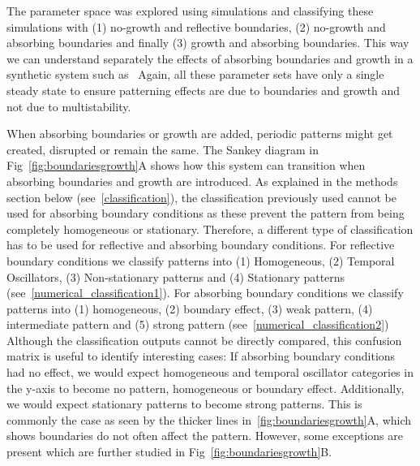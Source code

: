 The parameter space was explored using simulations and classifying these simulations with (1) no-growth and reflective boundaries, (2) no-growth and absorbing boundaries and finally (3) growth and absorbing boundaries. This way we can understand separately the effects of absorbing boundaries and growth in a synthetic system such as~\parencite{Oliver2023}
Again, all these parameter sets have only a single steady state to ensure patterning effects are due to boundaries and growth and not due to multistability.

When absorbing boundaries or growth are added, periodic patterns might get created, disrupted or remain the same. The Sankey diagram in Fig~\ref{fig:boundariesgrowth}A shows how this system can transition when absorbing boundaries and growth are introduced.
As explained in the methods section below (see~\ref{classification}), the classification previously used cannot be used for absorbing boundary conditions as these prevent the pattern from being completely homogeneous or stationary.  %
Therefore, a different type of classification has to be used for reflective and absorbing boundary conditions. For reflective boundary conditions we classify patterns into (1) Homogeneous, (2) Temporal Oscillators, (3) Non-stationary patterns and (4) Stationary patterns (see~\ref{numerical_classification1}). For absorbing boundary conditions we classify patterns into (1) homogeneous, (2) boundary effect, (3) weak pattern, (4) intermediate pattern and (5) strong pattern (see~\ref{numerical_classification2})
Although the classification outputs cannot be directly compared, this confusion matrix is useful to identify interesting cases:
If absorbing boundary conditions had no effect, we would expect homogeneous and temporal oscillator categories in the y-axis to become no pattern, homogeneous or boundary effect.
Additionally, we would expect stationary patterns to become strong patterns.
This is commonly the case as seen by the thicker lines in~\ref{fig:boundariesgrowth}A, which shows boundaries do not often affect the pattern.
However, some exceptions are present which are further studied in Fig~\ref{fig:boundariesgrowth}B.

